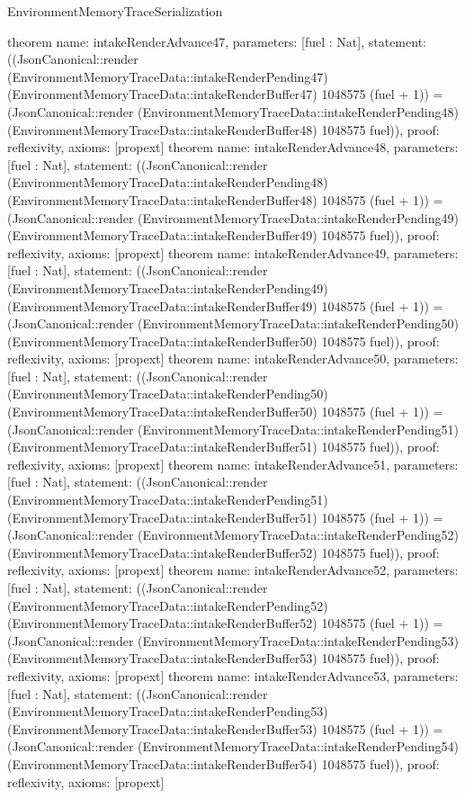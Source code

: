 \begin{lexlean}{EnvironmentMemoryTraceSerialization}
\begin{semanticmodule}
{}
theorem{
 name: intakeRenderAdvance47, parameters: [fuel : Nat],
 statement: ((JsonCanonical::render (EnvironmentMemoryTraceData::intakeRenderPending47) (EnvironmentMemoryTraceData::intakeRenderBuffer47) 1048575 (fuel + 1)) = (JsonCanonical::render (EnvironmentMemoryTraceData::intakeRenderPending48) (EnvironmentMemoryTraceData::intakeRenderBuffer48) 1048575 fuel)), proof: reflexivity{}, axioms: [propext]
}
theorem{
 name: intakeRenderAdvance48, parameters: [fuel : Nat],
 statement: ((JsonCanonical::render (EnvironmentMemoryTraceData::intakeRenderPending48) (EnvironmentMemoryTraceData::intakeRenderBuffer48) 1048575 (fuel + 1)) = (JsonCanonical::render (EnvironmentMemoryTraceData::intakeRenderPending49) (EnvironmentMemoryTraceData::intakeRenderBuffer49) 1048575 fuel)), proof: reflexivity{}, axioms: [propext]
}
theorem{
 name: intakeRenderAdvance49, parameters: [fuel : Nat],
 statement: ((JsonCanonical::render (EnvironmentMemoryTraceData::intakeRenderPending49) (EnvironmentMemoryTraceData::intakeRenderBuffer49) 1048575 (fuel + 1)) = (JsonCanonical::render (EnvironmentMemoryTraceData::intakeRenderPending50) (EnvironmentMemoryTraceData::intakeRenderBuffer50) 1048575 fuel)), proof: reflexivity{}, axioms: [propext]
}
theorem{
 name: intakeRenderAdvance50, parameters: [fuel : Nat],
 statement: ((JsonCanonical::render (EnvironmentMemoryTraceData::intakeRenderPending50) (EnvironmentMemoryTraceData::intakeRenderBuffer50) 1048575 (fuel + 1)) = (JsonCanonical::render (EnvironmentMemoryTraceData::intakeRenderPending51) (EnvironmentMemoryTraceData::intakeRenderBuffer51) 1048575 fuel)), proof: reflexivity{}, axioms: [propext]
}
theorem{
 name: intakeRenderAdvance51, parameters: [fuel : Nat],
 statement: ((JsonCanonical::render (EnvironmentMemoryTraceData::intakeRenderPending51) (EnvironmentMemoryTraceData::intakeRenderBuffer51) 1048575 (fuel + 1)) = (JsonCanonical::render (EnvironmentMemoryTraceData::intakeRenderPending52) (EnvironmentMemoryTraceData::intakeRenderBuffer52) 1048575 fuel)), proof: reflexivity{}, axioms: [propext]
}
theorem{
 name: intakeRenderAdvance52, parameters: [fuel : Nat],
 statement: ((JsonCanonical::render (EnvironmentMemoryTraceData::intakeRenderPending52) (EnvironmentMemoryTraceData::intakeRenderBuffer52) 1048575 (fuel + 1)) = (JsonCanonical::render (EnvironmentMemoryTraceData::intakeRenderPending53) (EnvironmentMemoryTraceData::intakeRenderBuffer53) 1048575 fuel)), proof: reflexivity{}, axioms: [propext]
}
theorem{
 name: intakeRenderAdvance53, parameters: [fuel : Nat],
 statement: ((JsonCanonical::render (EnvironmentMemoryTraceData::intakeRenderPending53) (EnvironmentMemoryTraceData::intakeRenderBuffer53) 1048575 (fuel + 1)) = (JsonCanonical::render (EnvironmentMemoryTraceData::intakeRenderPending54) (EnvironmentMemoryTraceData::intakeRenderBuffer54) 1048575 fuel)), proof: reflexivity{}, axioms: [propext]
}
\end{semanticmodule}
\end{lexlean}
